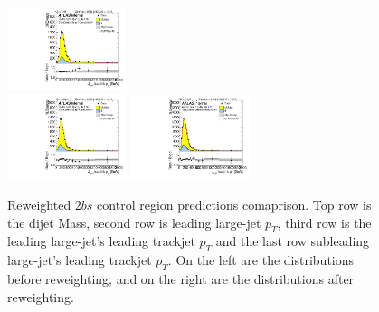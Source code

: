 \begin{figure}[htbp!]
\begin{center}
\includegraphics[width=0.31\textwidth,angle=-90]{figures/boosted/Control/b77_TwoTag_split_Control_leadHCand_trk0_Pt.pdf}\\
\includegraphics[width=0.31\textwidth,angle=-90]{figures/boosted/Prereweight/Moriond_TwoTag_split_Control_sublHCand_trk0_Pt.pdf}
\includegraphics[width=0.31\textwidth,angle=-90]{figures/boosted/Control/b77_TwoTag_split_Control_sublHCand_trk0_Pt.pdf}\\
\caption{Reweighted $2bs$ control region predictions comaprison. Top row is the dijet Mass, second row is leading large-\R jet $p_{T}$, third row is the leading large-\R jet's leading trackjet $p_T$ and the last row subleading large-\R jet's leading trackjet $p_T$. On the left are the distributions before reweighting, and on the right are the distributions after reweighting.}
\label{fig:rw-2bs-comp-cr}
\end{center}
\end{figure}


